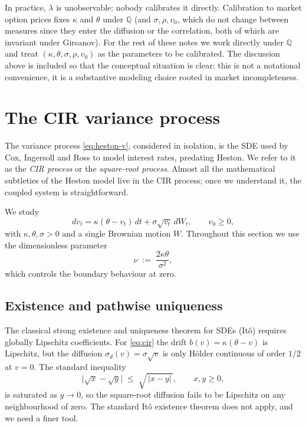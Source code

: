 \documentclass[11pt]{article}
\theoremstyle{plain}
\theoremstyle{definition}
\theoremstyle{remark}
\begin{document}
In practice, \(\lambda\) is unobservable: nobody calibrates it directly. Calibration to market option prices fixes \(\kappa\) and \(\theta\) under \(\mathbb{Q}\) (and \(\sigma, \rho, v_0\), which do not change between measures since they enter the diffusion or the correlation, both of which are invariant under Girsanov). For the rest of these notes we work directly under \(\mathbb{Q}\) and treat \((\kappa, \theta, \sigma, \rho, v_0)\) as the parameters to be calibrated. The discussion above is included so that the conceptual situation is clear: this is not a notational convenience, it is a substantive modeling choice rooted in market incompleteness.

\section{The CIR variance process}

The variance process \eqref{eq:heston-v}, considered in isolation, is the SDE used by Cox, Ingersoll and Ross \cite{CIR1985} to model interest rates, predating Heston. We refer to it as the \emph{CIR process} or the \emph{square-root process}. Almost all the mathematical subtleties of the Heston model live in the CIR process; once we understand it, the coupled system is straightforward.

We study
\begin{equation}
    dv_t = \kappa(\theta - v_t)\,dt + \sigma\sqrt{v_t}\,dW_t, \qquad v_0 \geq 0,             \label{eq:cir}
\end{equation}
with \(\kappa, \theta, \sigma > 0\) and a single Brownian motion \(W\). Throughout this section we use the dimensionless parameter
\[
    \nu \;:=\; \frac{2\kappa\theta}{\sigma^2},
\]
which controls the boundary behaviour at zero.

\subsection{Existence and pathwise uniqueness}

The classical strong existence and uniqueness theorem for SDEs (Itô) requires globally Lipschitz coefficients. For \eqref{eq:cir} the drift \(b(v) = \kappa(\theta - v)\) is Lipschitz, but the diffusion \(\sigma_d(v) = \sigma\sqrt{v}\) is only Hölder continuous of order \(1/2\) at \(v = 0\). The standard inequality
\begin{equation}
    \bigl|\sqrt{x} - \sqrt{y}\bigr| \;\leq\; \sqrt{\,|x - y|\,}, \qquad x, y \geq 0,            \label{eq:sqrt-holder}
\end{equation}
is saturated as \(y \to 0\), so the square-root diffusion fails to be Lipschitz on any neighbourhood of zero. The standard Itô existence theorem does not apply, and we need a finer tool.
\end{document}
